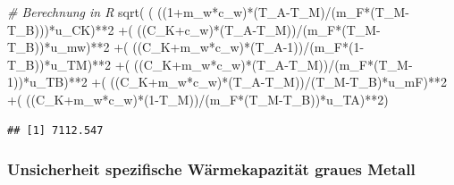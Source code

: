 \documentclass[class=article, crop=false]{standalone}
\newenvironment{Shaded}{\begin{snugshade}}{\end{snugshade}}
\newcommand{\CommentTok}[1]{\textcolor[rgb]{0.56,0.35,0.01}{\textit{#1}}}
\newcommand{\DecValTok}[1]{\textcolor[rgb]{0.00,0.00,0.81}{#1}}
\newcommand{\FunctionTok}[1]{\textcolor[rgb]{0.00,0.00,0.00}{#1}}
\newcommand{\NormalTok}[1]{#1}
\newcommand{\SpecialCharTok}[1]{\textcolor[rgb]{0.00,0.00,0.00}{#1}}
\begin{document}
\begin{Shaded}
\begin{Highlighting}[]
\CommentTok{\# Berechnung in R}
\FunctionTok{sqrt}\NormalTok{( ( ((}\DecValTok{1}\SpecialCharTok{+}\NormalTok{m\_w}\SpecialCharTok{*}\NormalTok{c\_w)}\SpecialCharTok{*}\NormalTok{(T\_A}\SpecialCharTok{{-}}\NormalTok{T\_M)}\SpecialCharTok{/}\NormalTok{(m\_F}\SpecialCharTok{*}\NormalTok{(T\_M}\SpecialCharTok{{-}}\NormalTok{T\_B)))}\SpecialCharTok{*}\NormalTok{u\_CK)}\SpecialCharTok{**}\DecValTok{2}
     \SpecialCharTok{+}\NormalTok{( ((C\_K}\SpecialCharTok{+}\NormalTok{c\_w)}\SpecialCharTok{*}\NormalTok{(T\_A}\SpecialCharTok{{-}}\NormalTok{T\_M))}\SpecialCharTok{/}\NormalTok{(m\_F}\SpecialCharTok{*}\NormalTok{(T\_M}\SpecialCharTok{{-}}\NormalTok{T\_B))}\SpecialCharTok{*}\NormalTok{u\_mw)}\SpecialCharTok{**}\DecValTok{2}
     \SpecialCharTok{+}\NormalTok{( ((C\_K}\SpecialCharTok{+}\NormalTok{m\_w}\SpecialCharTok{*}\NormalTok{c\_w)}\SpecialCharTok{*}\NormalTok{(T\_A}\DecValTok{{-}1}\NormalTok{))}\SpecialCharTok{/}\NormalTok{(m\_F}\SpecialCharTok{*}\NormalTok{(}\DecValTok{1}\SpecialCharTok{{-}}\NormalTok{T\_B))}\SpecialCharTok{*}\NormalTok{u\_TM)}\SpecialCharTok{**}\DecValTok{2}
     \SpecialCharTok{+}\NormalTok{( ((C\_K}\SpecialCharTok{+}\NormalTok{m\_w}\SpecialCharTok{*}\NormalTok{c\_w)}\SpecialCharTok{*}\NormalTok{(T\_A}\SpecialCharTok{{-}}\NormalTok{T\_M))}\SpecialCharTok{/}\NormalTok{(m\_F}\SpecialCharTok{*}\NormalTok{(T\_M}\DecValTok{{-}1}\NormalTok{))}\SpecialCharTok{*}\NormalTok{u\_TB)}\SpecialCharTok{**}\DecValTok{2}
     \SpecialCharTok{+}\NormalTok{( ((C\_K}\SpecialCharTok{+}\NormalTok{m\_w}\SpecialCharTok{*}\NormalTok{c\_w)}\SpecialCharTok{*}\NormalTok{(T\_A}\SpecialCharTok{{-}}\NormalTok{T\_M))}\SpecialCharTok{/}\NormalTok{(T\_M}\SpecialCharTok{{-}}\NormalTok{T\_B)}\SpecialCharTok{*}\NormalTok{u\_mF)}\SpecialCharTok{**}\DecValTok{2}
     \SpecialCharTok{+}\NormalTok{( ((C\_K}\SpecialCharTok{+}\NormalTok{m\_w}\SpecialCharTok{*}\NormalTok{c\_w)}\SpecialCharTok{*}\NormalTok{(}\DecValTok{1}\SpecialCharTok{{-}}\NormalTok{T\_M))}\SpecialCharTok{/}\NormalTok{(m\_F}\SpecialCharTok{*}\NormalTok{(T\_M}\SpecialCharTok{{-}}\NormalTok{T\_B))}\SpecialCharTok{*}\NormalTok{u\_TA)}\SpecialCharTok{**}\DecValTok{2}\NormalTok{)}
\end{Highlighting}
\end{Shaded}

\begin{verbatim}
## [1] 7112.547
\end{verbatim}

\hypertarget{unsicherheit-spezifische-wuxe4rmekapazituxe4t-graues-metall}{%
\subsubsection{Unsicherheit spezifische Wärmekapazität graues
Metall}\label{unsicherheit-spezifische-wuxe4rmekapazituxe4t-graues-metall}}
\end{document}
